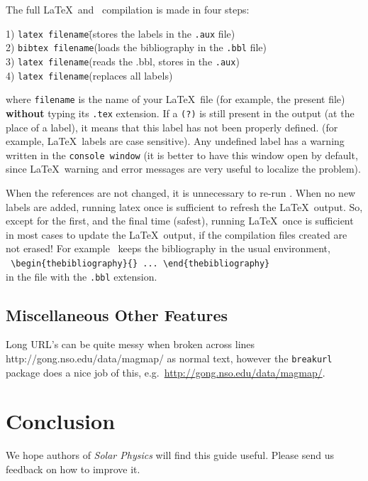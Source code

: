 \documentclass[namedreferences,hyperref,optionalrh,solaromanenum]{spr-sola}
\begin{document}
   The full \LaTeX\ and \BibTeX\ compilation is made in four steps: 
\begin{tabbing}
1) {\tt latex filename}\qquad\qquad\=(stores the labels in the {\tt .aux} file)\\
2) {\tt bibtex filename}\>(loads the bibliography in the {\tt .bbl} file)\\
3) {\tt latex filename}\>(reads the .bbl, stores in the {\tt .aux})\\
4) {\tt latex filename}\>(replaces all labels)  
\end{tabbing}
   where \texttt{filename} is the name of your \LaTeX\ file (for example, 
the present file) {\bf without} typing its \texttt{.tex} extension.
If a \texttt{(?)} is still present in the output (at the place of a label),
it means that this label has not been properly defined. 
 (for example, \LaTeX\ labels are case sensitive).
Any undefined label has a warning written in the \texttt{console window}
(it is better to have this window open by default, since \LaTeX\ warning and 
error messages are very useful to localize the problem).

  When the references are not changed, it is unnecessary to re-run \BibTeX .
When no new labels are added, running latex once is sufficient to refresh
the \LaTeX\ output. So, except for
the first, and the final time (safest), running \LaTeX\ once is sufficient
in most cases to update the \LaTeX\ output, if the compilation files 
created are not erased! For example \BibTeX\ keeps the bibliography in the usual 
environment,\\
  \verb+ \begin{thebibliography}{} ... \end{thebibliography}+\\
in the file with the \verb+.bbl+ extension.  

\subsection{Miscellaneous Other Features} %
\label{S-Miscellaneous} 
Long URL's can be quite messy when broken across lines
\textrm{http://gong.nso.edu/data/magmap/} as normal text,
however the \texttt{breakurl} package does a nice job of this, 
e.g.~\url{http://gong.nso.edu/data/magmap/}.
   
\section{Conclusion} %
\label{S-Conclusion} 
      We hope authors of {\it Solar Physics} will find this guide useful.
Please send us feedback on how to improve it.
      
\end{document}
